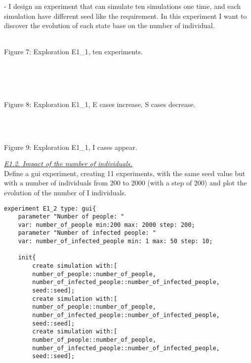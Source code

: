 \documentclass{article}
\begin{document}
\newline\newline
\begin{doc}
- I design an experiment that can simulate ten simulations one time, and each simulation have different seed like the requirement. In this experiment I want to discover the evolution of each state base on the number of individual.
\end{doc}
\newpage
\begin{pic7}
\\
\caption{Figure 7: Exploration E1\_1, ten experiments.}
\end{pic7}
\\\\
\begin{pic8}
\\
\caption{Figure 8: Exploration E1\_1, E cases increase, S cases decrease.}
\end{pic8}
\\
\begin{pic9}
\\
\caption{Figure 9: Exploration E1\_1, I cases appear.}
\end{pic9}
\newline\newline
\underline{\textit{E1.2. Impact of the number of individuals.}}
\\
Define a gui experiment, creating 11 experiments, with the same seed value but with a number of individuals from 200 to 2000 (with a step of 200) and plot the evolution of the number of I individuals.
\newline\newline
\begin{tcolorbox}
\begin{lstlisting}
experiment E1_2 type: gui{
	parameter "Number of people: " 
	var: number_of_people min:200 max: 2000 step: 200;
	parameter "Number of infected people: " 
	var: number_of_infected_people min: 1 max: 50 step: 10;
	
	init{
		create simulation with:[
		number_of_people::number_of_people,
		number_of_infected_people::number_of_infected_people,
		seed::seed];
		create simulation with:[
		number_of_people::number_of_people,
		number_of_infected_people::number_of_infected_people,
		seed::seed];
		create simulation with:[
		number_of_people::number_of_people,
		number_of_infected_people::number_of_infected_people,
		seed::seed];
		
		
\end{lstlisting}
\end{tcolorbox}
\end{document}
